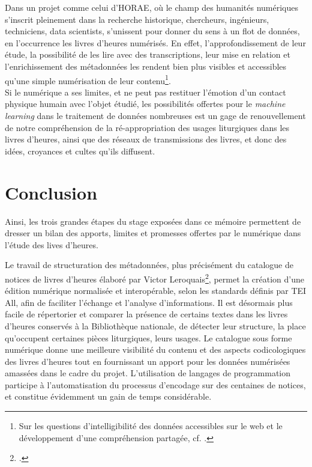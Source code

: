 \documentclass[a4paper,12pt,twoside]{book}
\begin{document}
	Dans un projet comme celui d'HORAE, où le champ des humanités numériques s'inscrit pleinement dans la recherche historique, chercheurs, ingénieurs, techniciens, data scientists, s'unissent pour donner du sens à un flot de données, en l'occurrence les livres d'heures numérisés. En effet, l'approfondissement de leur étude, la possibilité de les lire avec des transcriptions, leur mise en relation et l'enrichissement des métadonnées les rendent bien plus visibles et accessibles qu'une simple numérisation de leur contenu\footnote{Sur les questions d'intelligibilité des données accessibles sur le web et le développement d'une compréhension partagée, cf. \cite[p. 38-60]{switching_codes}.}. \\
	
	Si le numérique a ses limites, et ne peut pas restituer l'émotion d'un contact physique humain avec l'objet étudié, les possibilités offertes pour le \textit{machine learning} dans le traitement de données nombreuses est un gage de renouvellement de notre compréhension de la ré-appropriation des usages liturgiques dans les livres d'heures, ainsi que des réseaux de transmissions des livres, et donc des idées, croyances et cultes qu'ils diffusent.

	
	\chapter*{Conclusion}
	
	Ainsi, les trois grandes étapes du stage exposées dans ce mémoire permettent de dresser un bilan des apports, limites et promesses offertes par le numérique dans l'étude des lives d'heures. 
	
	Le travail de structuration des métadonnées, plus précisément du catalogue de notices de livres d'heures élaboré par Victor Leroquais\footcite{Leroquais_notices}, permet la création d'une édition numérique normalisée et interopérable, selon les standards définis par TEI All, afin de faciliter l'échange et l'analyse d'informations. Il est désormais plus facile de répertorier et comparer la présence de certains textes dans les livres d'heures conservés à la Bibliothèque nationale, de détecter leur structure, la place qu'occupent certaines pièces liturgiques, leurs usages. Le catalogue sous forme numérique donne une meilleure visibilité du contenu et des aspects codicologiques des livres d'heures tout en fournissant un apport pour les données numérisées amassées dans le cadre du projet. L'utilisation de langages de programmation participe à l'automatisation du processus d'encodage sur des centaines de notices, et constitue évidemment un gain de temps considérable. 
	
\end{document}
